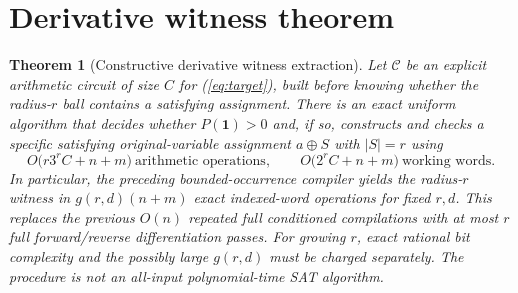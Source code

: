 \documentclass[11pt]{article}
\newtheorem{theorem}{Theorem}
\begin{document}
\section{Derivative witness theorem}
\begin{theorem}[Constructive derivative witness extraction]\label{thm:main}
Let $\mathcal C$ be an explicit arithmetic circuit of size $C$ for (\ref{eq:target}), built before knowing whether the radius-$r$ ball contains a satisfying assignment. There is an exact uniform algorithm that decides whether $P(\boldsymbol1)>0$ and, if so, constructs and checks a specific satisfying original-variable assignment $a\oplus S$ with $|S|=r$ using
\[\boxed{\ O\bigl(r3^r C+n+m\bigr)\ \text{arithmetic operations},\qquad O\bigl(2^rC+n+m\bigr)\ \text{working words}.\ }
\]
In particular, the preceding bounded-occurrence compiler yields the radius-$r$ witness in $g(r,d)(n+m)$ exact indexed-word operations for fixed $r,d$. This replaces the previous $O(n)$ repeated full conditioned compilations with at most $r$ full forward/reverse differentiation passes. For growing $r$, exact rational bit complexity and the possibly large $g(r,d)$ must be charged separately. The procedure is not an all-input polynomial-time SAT algorithm.
\end{theorem}
\end{document}
